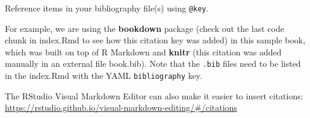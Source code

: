 \documentclass[
]{book}
\theoremstyle{definition}
\theoremstyle{definition}
\theoremstyle{definition}
\theoremstyle{definition}
\theoremstyle{remark}
\begin{document}
Reference items in your bibliography file(s) using \texttt{@key}.

For example, we are using the \textbf{bookdown} package \citep{R-bookdown} (check out the last code chunk in index.Rmd to see how this citation key was added) in this sample book, which was built on top of R Markdown and \textbf{knitr} \citep{xie2015} (this citation was added manually in an external file book.bib). Note that the \texttt{.bib} files need to be listed in the index.Rmd with the YAML \texttt{bibliography} key.

The RStudio Visual Markdown Editor can also make it easier to insert citations: \url{https://rstudio.github.io/visual-markdown-editing/\#/citations}

  
\end{document}
